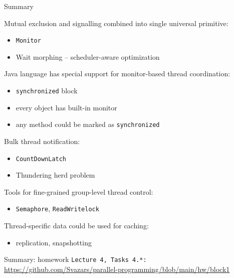 \begin{frame}{Summary}

Mutual exclusion and signalling combined into single universal primitive:
\begin{itemize}
    \item \texttt{Monitor}
    \item Wait morphing -- scheduler-aware optimization
\end{itemize}

Java language has special support for monitor-based thread coordination:
\begin{itemize}
    \item \texttt{synchronized} block
    \item every object has built-in monitor
    \item any method could be marked as \texttt{synchronized}
\end{itemize}

Bulk thread notification:
\begin{itemize}
    \item \texttt{CountDownLatch}
    \item Thundering herd problem
\end{itemize}

Tools for fine-grained group-level thread control:
\begin{itemize}
    \item \texttt{Semaphore}, \texttt{ReadWritelock}
\end{itemize}

Thread-specific data could be used for caching:
\begin{itemize}
    \item replication, snapshotting
\end{itemize}
\end{frame}


\begin{frame}{Summary: homework}
    \texttt{Lecture 4, Tasks 4.*:} {\tiny\url{https://github.com/Svazars/parallel-programming/blob/main/hw/block1}}
\end{frame}


